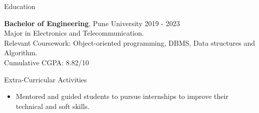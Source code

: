\documentclass{resume} %
\begin{document}
\begin{rSection}{Education}

{\bf Bachelor of Engineering}, Pune University \hfill {2019 - 2023}\\
Major in Electronics and Telecommunication.\\
Relevant Coursework: Object-oriented programming, DBMS, Data structures and Algorithm.\\
Cumulative CGPA: 8.82/10



\end{rSection}

\begin{rSection}{Extra-Curricular Activities} 
\begin{itemize}
    \item Mentored and guided students to pursue internships to improve their technical and soft skills.
\end{itemize}
\end{rSection}



\end{document}
